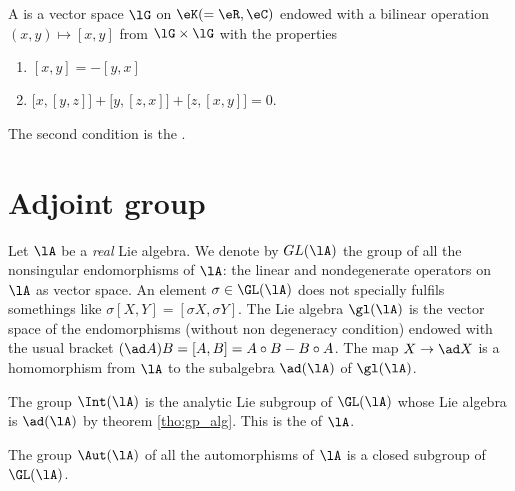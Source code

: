 

\begin{definition}
    A  is a vector space \( \lG\) on \( \eK(=\eR,\eC)\) endowed with a bilinear operation \( (x,y)\mapsto [x,y]\) from \( \lG\times\lG\) with the properties
    \begin{enumerate}
        \item
            \( [x,y]=-[y,x]\)
        \item
            \( \big[ x,[y,z] \big]+\big[ y,[z,x] \big]+\big[ z,[x,y] \big]=0\).
    \end{enumerate}
    The second condition is the .
\end{definition}

\section{Adjoint group}\label{sec:adj_gp}

Let $\lA$ be a \emph{real} Lie algebra. We denote by $GL(\lA)$ the group of all the nonsingular endomorphisms of $\lA$: the linear and nondegenerate operators on $\lA$ as vector space. An element $\sigma\in\GL(\lA)$ does not specially fulfils somethings like $\sigma[X,Y]=[\sigma X,\sigma Y]$. The Lie algebra $\gl(\lA)$ is the vector space of the endomorphisms (without non degeneracy condition) endowed with the usual bracket $(\ad A)B=[A,B]=A\circ B-B\circ A$. The map $X\to\ad X$ is a homomorphism from $\lA$ to the subalgebra $\ad(\lA)$ of $\gl(\lA)$.

The group $\Int(\lA)$ is the analytic Lie subgroup of $\GL(\lA)$ whose Lie algebra is $\ad(\lA)$ by theorem \ref{tho:gp_alg}. This is the  of $\lA$.

\begin{proposition}
The group $\Aut(\lA)$ of all the automorphisms of $\lA$ is a closed subgroup of $\GL(\lA)$.
\end{proposition}

